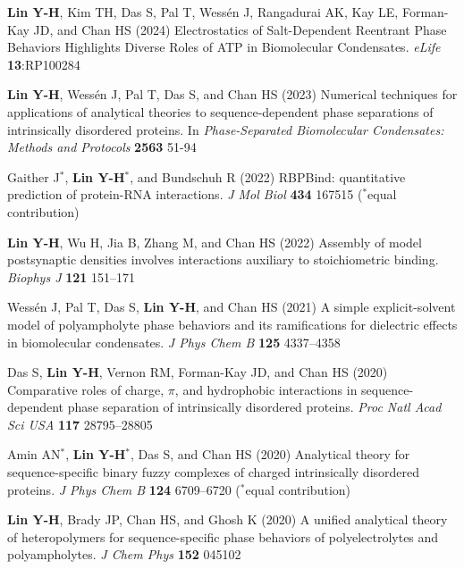 \documentclass[11pt]{../yhlcv}
\def\tname#1{{\bf #1}}
\begin{document}
\begin{etaremune}[leftmargin=0.26in]\itemsep-0.2pt

\item
\tname{Lin Y-H}, Kim TH, Das S, Pal T, Wessén J, Rangadurai AK, Kay LE, Forman-Kay JD, and Chan HS (2024)
Electrostatics of Salt-Dependent Reentrant Phase Behaviors Highlights Diverse Roles of ATP in Biomolecular Condensates.
{\it eLife} {\bf 13}:RP100284


\item
\tname{Lin Y-H}, Wessén J, Pal T, Das S, and Chan HS (2023)
Numerical techniques for applications of analytical theories to sequence-dependent phase separations of intrinsically disordered proteins.
In {\it Phase-Separated Biomolecular Condensates: Methods and Protocols} {\bf 2563} 51-94

\item
Gaither J$^*$, \tname{Lin Y-H}$^*$, and Bundschuh R (2022)
RBPBind: quantitative prediction of protein-RNA interactions.
{\it J Mol Biol} {\bf 434} 167515
($^*$equal contribution)

\item 
\tname{Lin Y-H}, Wu H, Jia B, Zhang M, and Chan HS (2022)
Assembly of model postsynaptic densities involves interactions auxiliary to stoichiometric binding.
{\it Biophys J} {\bf 121} 151--171

\item 
Wessén J, Pal T, Das S, \tname{Lin Y-H}, and Chan HS (2021)
A simple explicit-solvent model of polyampholyte phase behaviors and its ramifications for dielectric effects in biomolecular condensates.
{\it J Phys Chem B} {\bf 125} 4337--4358 %

\item 
Das S, \tname{Lin Y-H}, Vernon RM, Forman-Kay JD, and Chan HS (2020)
Comparative roles of charge, $\pi$, and hydrophobic interactions in sequence-dependent phase separation of intrinsically disordered proteins.
{\it Proc Natl Acad Sci USA} {\bf 117} 28795--28805

\item 
Amin AN$^*$, \tname{Lin Y-H}$^*$, Das S, and Chan HS (2020)
Analytical theory for sequence-specific binary fuzzy complexes of charged intrinsically disordered proteins.
{\it J Phys Chem B} 
{\bf 124} 6709--6720
($^*$equal contribution) %

\item
\tname{Lin Y-H}, Brady JP, Chan HS, and Ghosh K (2020)
A unified analytical theory of heteropolymers for sequence-specific phase behaviors of polyelectrolytes and polyampholytes. 
{\it J Chem Phys} {\bf 152} 045102


\end{etaremune}
\end{document}
